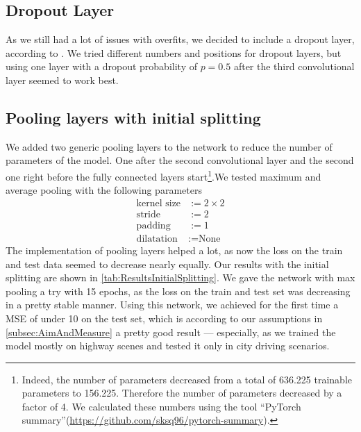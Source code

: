 \documentclass[conference]{IEEEtran}
\begin{document}
\subsection{Dropout Layer}
As we still had a lot of issues with overfits, we decided to include a dropout layer, according to \cite{Dropout2014}. We tried different numbers and positions for dropout layers, but using one layer with a dropout 
probability of $p=0.5$ after the third convolutional layer seemed to work best.



\subsection{Pooling layers with initial splitting}
We added two generic pooling layers to the network to reduce the number of parameters of the model. One after the second 
convolutional layer and the second one right before the fully connected layers start\footnote{Indeed, the number of 
parameters decreased from a total of 636.225 trainable parameters to 156.225. Therefore the number of parameters decreased by a 
factor of 4. We calculated these numbers using the tool \enquote{PyTorch summary}(\url{https://github.com/sksq96/pytorch-summary}).}.We tested maximum and average pooling with the following 
parameters
\begin{align*}
\text{kernel size} &:= 2\times 2\\
\text{stride} &:= 2\\
\text{padding} &:= 1\\
\text{dilatation} &:= \text{None}
\end{align*}
The implementation of pooling layers helped a lot, as now the loss on the train and test data seemed to decrease 
nearly equally. Our results with the initial splitting are shown in \cref{tab:ResultsInitialSplitting}. We gave the network
with max pooling a try with 15 epochs, as the loss on the train and test set was decreasing in a pretty stable manner. Using this
network, we achieved for the first time a MSE of under 10 on the test set, which is according to our assumptions in \cref{subsec:AimAndMeasure} a 
pretty good result --- especially, as we trained the model mostly on highway scenes and tested it only in city driving scenarios.
\end{document}
